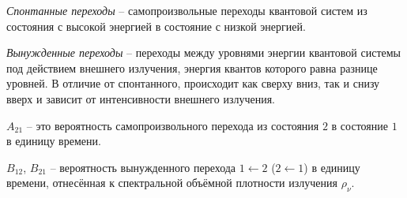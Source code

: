 

\emph{Спонтанные переходы} -- самопроизвольные переходы квантовой систем 
из состояния с высокой энергией в состояние с низкой энергией.

\emph{Вынужденные переходы} -- переходы между уровнями энергии квантовой 
системы под действием внешнего излучения, энергия квантов которого равна 
разнице уровней. В отличие от спонтанного, происходит как сверху вниз, так 
и снизу вверх и зависит от интенсивности внешнего излучения.


\begin{figure}[h!]
	\center
	\label{img1.1}
\end{figure}

\( A_{21} \) -- это вероятность самопроизвольного перехода из состояния 
\( 2 \) в состояние \( 1 \) в единицу времени. 

\( B_{12} \), \( B_{21} \) -- вероятность вынужденного перехода 
\( 1 \leftarrow 2 \) (\( 2 \leftarrow 1 \)) в единицу времени, отнесённая к 
спектральной объёмной плотности излучения \( \rho_\nu \).